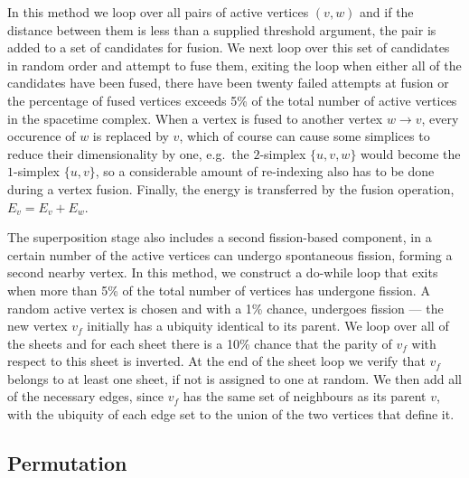 \documentclass[12pt,letterpaper]{report}
\begin{document}
In this method we loop over all pairs of active vertices $(v,w)$ and if the distance between them is 
less than a supplied threshold argument, the pair is added to a set of candidates for fusion. We next 
loop over this set of candidates in random order and attempt to fuse them, exiting the loop when either 
all of the candidates have been fused, there have been twenty failed attempts at fusion or the percentage 
of fused vertices exceeds 5\% of the total number of active vertices in the spacetime complex. When 
a vertex is fused to another vertex $w\to v$, every occurence of $w$ is replaced by $v$, which of course 
can cause some simplices to reduce their dimensionality by one, e.g.\ the $2$-simplex $\{u,v,w\}$ would 
become the $1$-simplex $\{u,v\}$, so a considerable amount of re-indexing also has to be done during 
a vertex fusion. Finally, the energy is transferred by the fusion operation, $E_v = E_v + E_w$.  

The superposition stage also includes a second fission-based component, in a certain number of the 
active vertices can undergo spontaneous fission, forming a second nearby vertex. In this method, we 
construct a do-while loop that exits when more than 5\% of the total number of vertices has undergone 
fission. A random active vertex is chosen and with a 1\% chance, undergoes fission --- the new vertex 
$v_f$ initially has a ubiquity identical to its parent. We loop over all of the sheets and for each 
sheet there is a 10\% chance that the parity of $v_f$ with respect to this sheet is inverted. At the 
end of the sheet loop we verify that $v_f$ belongs to at least one sheet, if not is assigned to one 
at random. We then add all of the necessary edges, since $v_f$ has the same set of neighbours as its 
parent $v$, with the ubiquity of each edge set to the union of the two vertices that define it.    

\subsection{Permutation}
\end{document}
